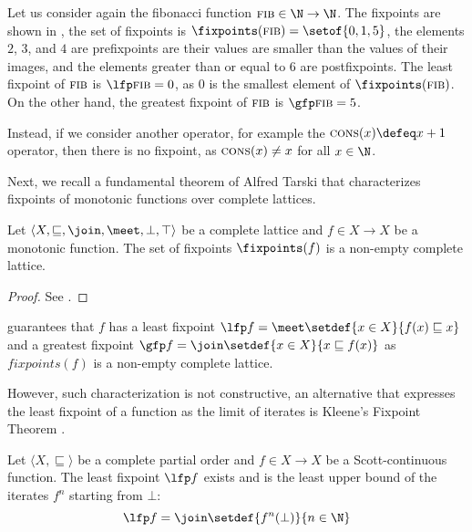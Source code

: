 \begin{example}
  Let us consider again the fibonacci function $\textsc{fib} \in \N \to \N$. The fixpoints are shown in , the set of fixpoints is $\fixpoints(\textsc{fib}) = \setof{0, 1, 5}$, the elements $2$, $3$, and $4$ are prefixpoints are their values are smaller than the values of their images, and the elements greater than or equal to $6$ are postfixpoints.
  The least fixpoint of $\textsc{fib}$ is $\lfp \textsc{fib} = 0$, as $0$ is the smallest element of $\fixpoints(\textsc{fib})$.
  On the other hand, the greatest fixpoint of $\textsc{fib}$ is $\gfp \textsc{fib} = 5$.

  Instead, if we consider another operator, for example the $\textsc{cons}(x) \defeq x + 1$ operator, then there is no fixpoint, as $\textsc{cons}(x) \neq x$ for all $x \in \N$.
\end{example}

Next, we recall a fundamental theorem of Alfred Tarski  that characterizes fixpoints of monotonic functions over complete lattices.

\begin{theorem}
  Let $\langle X, \sqsubseteq, \join, \meet, \bot, \top \rangle$ be a complete lattice and $f \in X \to X$ be a monotonic function. The set of fixpoints $\fixpoints(f)$ is a non-empty complete lattice.
\end{theorem}
\begin{proof}
  See \textcite{Tarski1955}.
\end{proof}
 guarantees that $f$ has a least fixpoint $\lfp f = \meet \setdef{x \in X}{f(x) \sqsubseteq x}$ and a greatest fixpoint $\gfp f = \join \setdef{x \in X}{x \sqsubseteq f(x)}$ as $fixpoints(f)$ is a non-empty complete lattice.

However, such characterization is not constructive, an alternative that expresses the least fixpoint of a function as the limit of iterates is Kleene's Fixpoint Theorem .


\begin{theorem}
  Let $\langle X, \sqsubseteq \rangle$ be a complete partial order and $f \in X \to X$ be a Scott-continuous function. The least fixpoint $\lfp f$ exists and is the least upper bound of the iterates $f^n$ starting from $\bot$:
  \[ \lfp f = \join \setdef{f^n(\bot)}{n \in \N} \]
\end{theorem}

